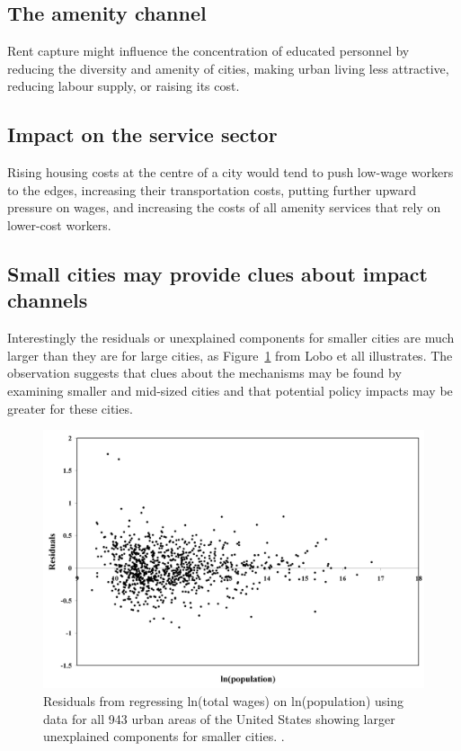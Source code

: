 \subsection{The amenity channel}
Rent capture might influence the concentration of educated personnel by reducing the diversity and amenity of cities, making urban living less attractive, reducing labour supply, or raising its cost.



\subsection{Impact on the service sector}
Rising housing costs at the centre of a city would tend to push low-wage workers to the edges, increasing their transportation costs, putting further upward pressure on wages, and increasing the costs of all amenity services that rely on lower-cost workers.

\subsection{Small cities may provide clues about impact channels }\label{sec-fig-residuals}
Interestingly the residuals or unexplained components for smaller cities are much larger than they are for large cities, as Figure~\ref{fig-residuals-lobo} from Lobo et all \cite{loboUrbanScalingProduction2013} illustrates. The observation suggests that clues about the mechanisms may be found by examining smaller and mid-sized cities and that potential policy impacts may be greater for these cities.

\begin{figure}[h!tb]
\centering
\includegraphics[scale=0.30]{fig/residuals-lobo.png}
\caption{Residuals from regressing ln(total wages) on ln(population) using data for all 943 urban areas of the United States showing larger unexplained components for smaller cities. \cite{loboUrbanScalingProduction2013}.}
\label{fig-residuals-lobo}
\end{figure}




